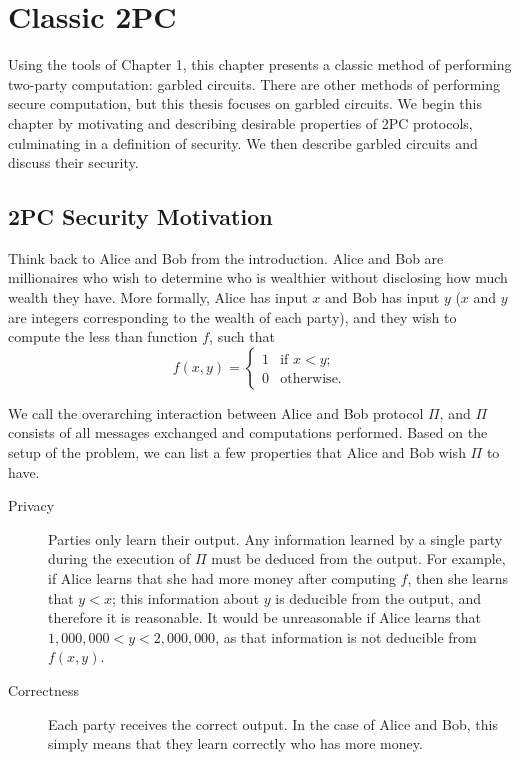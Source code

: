\chapter{Classic 2PC}

Using the tools of Chapter 1, this chapter presents a classic method of performing two-party computation: garbled circuits.
There are other methods of performing secure computation, but this thesis focuses on garbled circuits. 
We begin this chapter by motivating and describing desirable properties of 2PC protocols, culminating in a definition of security. 
We then describe garbled circuits and discuss their security.

\section{2PC Security Motivation}
Think back to Alice and Bob from the introduction. 
Alice and Bob are millionaires who wish to determine who is wealthier without disclosing how much wealth they have.
More formally, Alice has input $x$ and Bob has input $y$ ($x$ and $y$ are integers corresponding to the wealth of each party), and they wish to compute the less than function $f$, such that 
\begin{equation}
    \label{less-than}
f(x,y) = \left\{
\begin{array}{lr}
    1 & \text{if } x < y \text{;} \\
    0 & \text{otherwise.}
\end{array}
\right.
\end{equation} 

We call the overarching interaction between Alice and Bob protocol $\Pi$, and $\Pi$ consists of all messages exchanged and computations performed.
Based on the setup of the problem, we can list a few properties that Alice and Bob wish $\Pi$ to have.
\begin{description}
    \item[Privacy] 
        Parties only learn their output. 
        Any information learned by a single party during the execution of $\Pi$ must be deduced from the output. 
        For example, if Alice learns that she had more money after computing $f$, then she learns that $y < x$; this information about $y$ is deducible from the output, and therefore it is reasonable.
        It would be unreasonable if Alice learns that $1,000,000 < y < 2,000,000$, as that information is not deducible from $f(x,y)$.
    \item[Correctness] 
        Each party receives the correct output.
        In the case of Alice and Bob, this simply means that they learn correctly who has more money.

\end{description}

